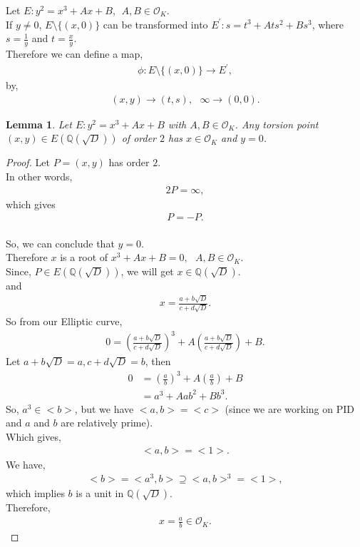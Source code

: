 \documentclass[12pt,leqno]{amsart}
\newcommand{\<}{\langle}
\renewcommand{\>}{\rangle}
\newtheorem{lemma}{Lemma}
\theoremstyle{definition}
\numberwithin{equation}{section}
\begin{document}
Let $E:y^2=x^3+Ax+B,~~A,B\in{\mathcal{O}_K}$.\\
If $y\neq 0$, $E\setminus \{(x,0)\}$ can be transformed into $E^{'}:s=t^3+Ats^2+Bs^3$, where $s=\frac{1}{y}$ and $t=\frac{x}{y}$.\\
Therefore we can define a map, 
\begin{align*}
    \phi:E\setminus \{(x,0)\}\longrightarrow E^{'},
\end{align*} 
by,
\begin{align*}
    (x,y)\longrightarrow(t,s),~~~\infty \longrightarrow(0,0).
\end{align*}

\begin{lemma}\label{lemma8}
     Let $E:y^2=x^3+Ax+B$ with $A,B\in {\mathcal{O}_K}$. Any torsion point $(x,y)\in E(\mathbb Q(\sqrt{D}))$ of order $2$ has $x\in{\mathcal{O}_K}$ and $y=0$.
\end{lemma}
 \begin{proof}
     Let $P=(x,y)$ has order $2$.\\
    In other words,
    \begin{align*}
        2P=\infty,
    \end{align*}
    which gives
    \begin{align*}
        P=-P.
    \end{align*}
    \\
    So, we can conclude that $y=0$.\\
    Therefore $x$ is a root of $x^3+Ax+B=0,~~~ A,B\in{\mathcal{O}_K}$.\\
    Since, $P\in E(\mathbb Q(\sqrt{D}))$, we will get $x\in\mathbb Q(\sqrt{D})$.\\
    and
    \begin{align*}
        x=\frac{a+b\sqrt{D}}{c+d\sqrt{D}}.
    \end{align*}
    So from our Elliptic curve,
    \begin{align*}
        0=\left(\frac{a+b\sqrt{D}}{c+d\sqrt{D}}\right)^3+A\left(\frac{a+b\sqrt{D}}{c+d\sqrt{D}}\right)+B.
    \end{align*}
    Let $a+b\sqrt{D}=a, c+d\sqrt{D}=b$, then
    \begin{align*}
        0&=\left(\frac{a}{b}\right)^3+A\left(\frac{a}{b}\right)+B\\
        &=a^3+Aab^2+Bb^3.
    \end{align*}
    So, $a^3\in<b>$, but we have $<a,b>=<c>$ (since we are working on PID and $a$ and $b$ are relatively prime).\\
    Which gives,
    \begin{align*}
        <a,b>=<1>.
    \end{align*}
    We have,
    \begin{align*}
        <b>=<a^3,b>\supseteq <a,b>^3=<1>,
    \end{align*}
    which implies $b$ is a unit in $\mathbb Q(\sqrt{D})$.\\
    Therefore,
    \begin{align*}
        x=\frac{a}{b}\in {\mathcal{O}_K}.
    \end{align*}
 \end{proof}
\end{document}
